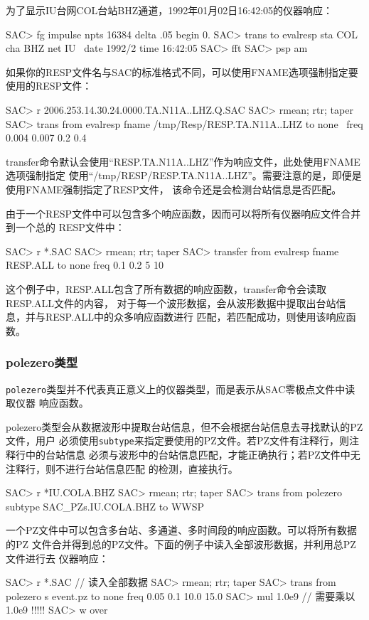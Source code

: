 为了显示IU台网COL台站BHZ通道，1992年01月02日16:42:05的仪器响应：
\begin{SACCode}
SAC> fg impulse npts 16384 delta .05 begin 0.
SAC> trans to evalresp sta COL cha BHZ net IU \
                    date 1992/2 time 16:42:05
SAC> fft
SAC> psp am
\end{SACCode}

如果你的RESP文件名与SAC的标准格式不同，可以使用FNAME选项强制指定要使用的RESP文件：
\begin{SACCode}
SAC> r 2006.253.14.30.24.0000.TA.N11A..LHZ.Q.SAC
SAC> rmean; rtr; taper
SAC> trans from evalresp fname /tmp/Resp/RESP.TA.N11A..LHZ to none \
                        freq 0.004 0.007 0.2 0.4
\end{SACCode}
transfer命令默认会使用``RESP.TA.N11A..LHZ''作为响应文件，此处使用FNAME选项强制指定
使用``/tmp/RESP/RESP.TA.N11A..LHZ''。需要注意的是，即便是使用FNAME强制指定了RESP文件，
该命令还是会检测台站信息是否匹配。

由于一个RESP文件中可以包含多个响应函数，因而可以将所有仪器响应文件合并到一个总的
RESP文件中：
\begin{SACCode}
SAC> r *.SAC
SAC> rmean; rtr; taper
SAC> transfer from evalresp fname RESP.ALL to none freq 0.1 0.2 5 10
\end{SACCode}
这个例子中，RESP.ALL包含了所有数据的响应函数，transfer命令会读取RESP.ALL文件的内容，
对于每一个波形数据，会从波形数据中提取出台站信息，并与RESP.ALL中的众多响应函数进行
匹配，若匹配成功，则使用该响应函数。

\subsubsection{polezero类型}
\verb+polezero+类型并不代表真正意义上的仪器类型，而是表示从SAC零极点文件中读取仪器
响应函数。

polezero类型会从数据波形中提取台站信息，但不会根据台站信息去寻找默认的PZ文件，用户
必须使用\verb+subtype+来指定要使用的PZ文件。若PZ文件有注释行，则注释行中的台站信息
必须与波形中的台站信息匹配，才能正确执行；若PZ文件中无注释行，则不进行台站信息匹配
的检测，直接执行。
\begin{SACCode}
SAC> r *IU.COLA.BHZ
SAC> rmean; rtr; taper
SAC> trans from polezero subtype SAC_PZs.IU.COLA.BHZ to WWSP
\end{SACCode}

一个PZ文件中可以包含多台站、多通道、多时间段的响应函数。可以将所有数据的PZ
文件合并得到总的PZ文件。下面的例子中读入全部波形数据，并利用总PZ文件进行去
仪器响应：
\begin{SACCode}
SAC> r *.SAC          // 读入全部数据
SAC> rmean; rtr; taper
SAC> trans from polezero s event.pz to none freq 0.05 0.1 10.0 15.0
SAC> mul 1.0e9        // 需要乘以1.0e9 !!!!!
SAC> w over
\end{SACCode}


